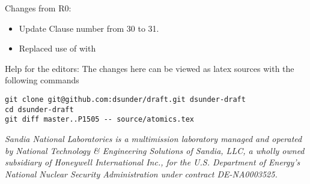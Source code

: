 Changes from R0:
\begin{itemize}
\item{Update Clause number from 30 to 31.}
\item{Replaced use of  with }
\end{itemize}

\vspace*{\fill}

Help for the editors: The changes here can be viewed as latex sources with the following commands
\begin{verbatim}
git clone git@github.com:dsunder/draft.git dsunder-draft
cd dsunder-draft
git diff master..P1505 -- source/atomics.tex
\end{verbatim}


\textit{Sandia National Laboratories is a multimission laboratory managed and operated
by National Technology \& Engineering Solutions of Sandia, LLC, a wholly owned
subsidiary of Honeywell International Inc., for the U.S. Department of Energy’s
National Nuclear Security Administration under contract DE-NA0003525.
}

\newpage
